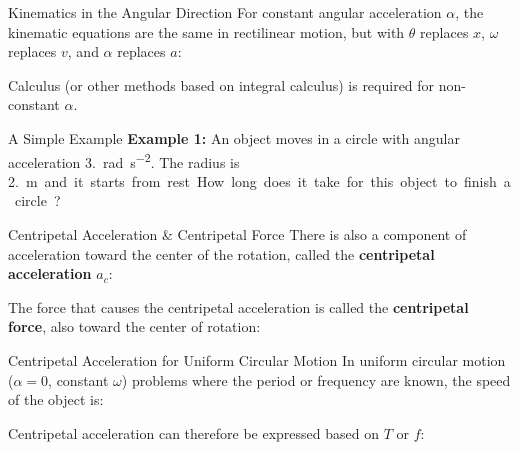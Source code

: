 \documentclass[12pt,compress,aspectratio=169]{beamer}
\begin{document}
\begin{frame}{Kinematics in the Angular Direction}
  For constant angular acceleration $\alpha$, the kinematic equations are the
  same in rectilinear motion, but with $\theta$ replaces $x$, $\omega$
  replaces $v$, and $\alpha$ replaces $a$:

  \vspace{-.3in}{\Large
    \begin{align*}
      \theta&=\theta_0 + \omega_0 t + \frac12\alpha t^2\\
      \theta&=\theta_0+ \alpha t\\
      \omega^2& = \omega_0^2+ 2\alpha(\theta-\theta_0)
    \end{align*}
  }
  Calculus (or other methods based on integral calculus) is required for
  non-constant $\alpha$.
\end{frame}



\begin{frame}{A Simple Example}
  \textbf{Example 1:} An object moves in a circle with angular acceleration
  \SI{3.}{rad\per\second\squared}. The radius is \SI{2.}\metre and it starts
  from rest. How long does it take for this object to finish a circle?
\end{frame}



\begin{frame}{Centripetal Acceleration \& Centripetal Force}
  There is also a component of acceleration toward the center of the rotation,
  called the \textbf{centripetal acceleration} $a_c$:


  The force that causes the centripetal acceleration is called the
  \textbf{centripetal force}, also toward the center of rotation:

\end{frame}



\begin{frame}{Centripetal Acceleration for Uniform Circular Motion}
  In uniform circular motion ($\alpha=0$, constant $\omega$) problems
  where the period or frequency are known, the speed of the object is:


  Centripetal acceleration can therefore be expressed based on $T$ or $f$:

\end{frame}
\end{document}
